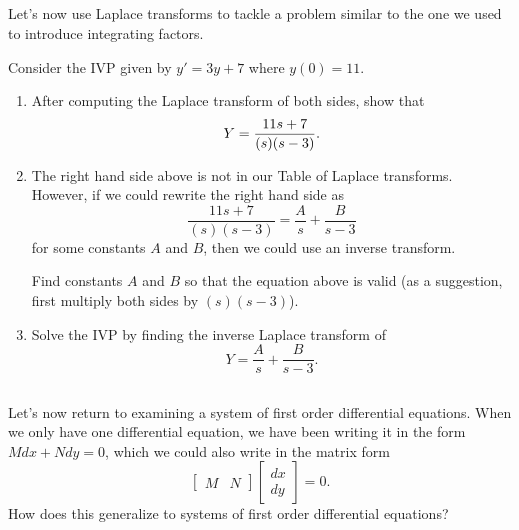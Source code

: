 \subsection*{\ideaC}

Let's now use Laplace transforms to tackle a problem similar to the one we used to introduce integrating factors. 

\begin{problem}
 Consider the IVP given by $y'=3y+7$ where $y(0)=11$.  
\begin{enumerate}
 \item 
After computing the Laplace transform of both sides, show that 
$$\displaystyle Y = \frac{11s+7}{(s)(s-3)}.$$
 \item 
{}%
%
The right hand side above is not in our Table of Laplace transforms. However, if we could rewrite the right hand side as 
$$\frac{11s+7}{(s)(s-3)} = \frac{A}{s}+\frac{B}{s-3}$$ 
for some constants $A$ and $B$, then we could use an inverse transform.

Find constants $A$ and $B$ so that the equation above is valid (as a suggestion, first multiply both sides by $(s)(s-3)$).
 \item 
{}%
Solve the IVP by finding the inverse Laplace transform of 
$$Y = \frac{A}{s}+\frac{B}{s-3}.$$ 

\end{enumerate}

\end{problem}

\subsection*{\ideaE}

Let's now return to examining a system of first order differential equations.  When we only have one differential equation, we have been writing it in the form $Mdx+Ndy=0$, which we could also write in the matrix form 
$$\begin{bmatrix}M&N\end{bmatrix}\begin{bmatrix}dx\\dy\end{bmatrix}=0.$$    
How does this generalize to systems of first order differential equations?

